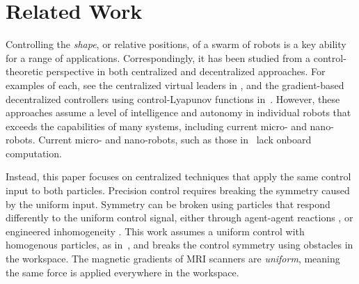 
\section{Related Work}\label{sec:RelatedWork}

Controlling the \emph{shape}, or relative positions, of a swarm of robots is a key ability for a range of applications.  Correspondingly, it has been studied from a control-theoretic perspective in  both centralized and decentralized approaches. For examples of each, see the centralized virtual leaders in \cite{egerstedt2001formation}, and the  gradient-based decentralized controllers  using control-Lyapunov functions in~\cite{hsieh2008decentralized}. However, these approaches assume a level of intelligence and autonomy in individual robots that exceeds the capabilities of many systems, including current micro- and nano-robots.  Current micro- and nano-robots, such as those in~\cite{Chowdhury2015,martel2015magnetotactic,Xiaohui2015magnetiteMicroswimmers} lack onboard computation.

Instead, this paper focuses on centralized techniques that apply the same control input to both particles. 
Precision control requires breaking the symmetry caused by the uniform input.  
Symmetry can be broken using particles that respond differently to the uniform control signal, either through agent-agent reactions \cite{bertozzi2015ring}, or engineered inhomogeneity  \cite{Donald2013,bretl2007,beckerIJRR2014}. 
This work assumes a uniform control with homogenous particles, as in~\cite{AaronManipulation2013}, and breaks the control symmetry using obstacles in the workspace. The magnetic gradients of MRI scanners are \emph{uniform}, meaning the same force is applied everywhere in the workspace\cite{nosrati2018development}.



